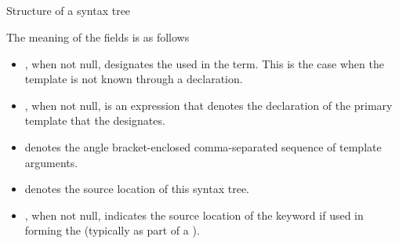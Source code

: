 

\subsection{}
\label{sec:ifc:SyntaxSort:TemplateId}

\begin{Structure}
	\caption{Structure of a  syntax tree}
	\label{fig:ifc:SyntaxSort:TemplateId}
\end{Structure}
The meaning of the fields is as follows
\begin{itemize}
	\item {}, when not null, designates the  used in the  term.  This is the case when the template is not known through a declaration.
	\item {}, when not null, is an expression that denotes the declaration of the primary template that the  designates.
	\item {} denotes the angle bracket-enclosed comma-separated sequence of template arguments.
	\item {} denotes the source location of this syntax tree.
	\item {}, when not null, indicates the source location of the  keyword if used in forming the  (typically as part of a ).
\end{itemize}



\subsection{}
\label{sec:ifc:SyntaxSort:MemInitializer}



\subsection{}
\label{sec:ifc:SyntaxSort:CtorInitializer}

